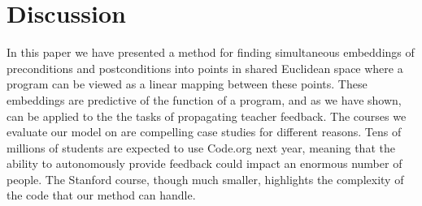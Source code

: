 \section{Discussion}
In this paper we have presented a method for finding simultaneous embeddings of preconditions and postconditions into points in shared Euclidean space where a program can be viewed as a linear 
mapping between these points. 
These embeddings are predictive of the function of a program, and
as we have shown, can be applied to the the tasks of propagating teacher feedback. The courses we evaluate our model on are compelling case studies for different reasons. Tens of millions of students are expected to use Code.org next year,  meaning that the ability to autonomously provide feedback could impact an enormous number of people.  The Stanford course, though much smaller, highlights
the complexity of the code that our method can handle.

